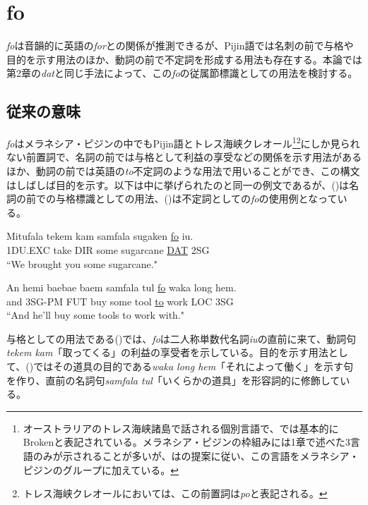 \chapter{fo}
\textit{fo}は音韻的に英語の\textit{for}との関係が推測できるが、Pijin語では名刺の前で与格や目的を示す用法のほか、動詞の前で不定詞を形成する用法も存在する。本論では第2章の\textit{dat}と同じ手法によって、この\textit{fo}の従属節標識としての用法を検討する。

\section{従来の意味}\label{sec:originalfo}
\textit{fo}はメラネシア・ピジンの中でもPijin語とトレス海峡クレオール\footnote{
\label{fn:broken}
オーストラリアのトレス海峡諸島で話される個別言語で、\cite{prepositions}では基本的にBrokenと表記されている。メラネシア・ピジンの枠組みには1章で述べた3言語のみが示されることが多いが、\cite{prepositions}は\cite{keesing}の提案に従い、この言語をメラネシア・ピジンのグループに加えている。}\footnote{
トレス海峡クレオールにおいては、この前置詞は\textit{po}と表記される\citep{prepositions}。}にしか見られない前置詞で、名詞の前では与格として利益の享受などの関係を示す用法があるほか、動詞の前では英語の\textit{to}不定詞のような用法で用いることができ、この構文はしばしば目的を示す\citep{prepositions}。以下は\cite{prepositions}中に挙げられたのと同一の例文であるが、()は名詞の前での与格標識としての用法、()は不定詞としての\textit{fo}の使用例となっている。

\begin{exe}
\ex
\gll Mitufala tekem kam samfala sugaken \underline{fo} iu.\\
1DU.EXC take DIR some sugarcane \underline{DAT} 2SG\\
\glt ``We brought you some sugarcane." \cite[44]{rr2}

\ex\label{ex:fowaka}
\gll An hemi baebae baem samfala tul \underline{fo} waka long hem.\\
and 3SG-PM FUT buy some tool \underline{to} work LOC 3SG\\
\glt ``And he'll buy some tools to work with." \cite[270]{todd}
\end{exe}

与格としての用法である()では、\textit{fo}は二人称単数代名詞\textit{iu}の直前に来て、動詞句\textit{tekem kam}「取ってくる」の利益の享受者を示している。目的を示す用法として、()ではその道具の目的である\textit{waka long hem}「それによって働く」を示す句を作り、直前の名詞句\textit{samfala tul}「いくらかの道具」を形容詞的に修飾している。

